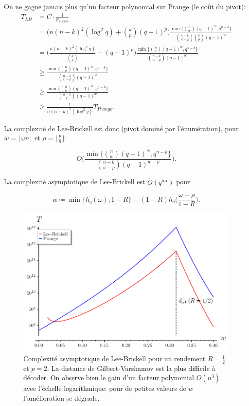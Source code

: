 \documentclass{scrartcl}[a4paper,10pt,headings=small,footinclude=false]
\theoremstyle{definition}
\theoremstyle{remark}
\begin{document}
On ne gagne jamais plus qu'un facteur polynomial sur Prange (le coût du pivot):
\begin{align*}
T_{LB} &= C\cdot \frac{1}{\mathbb{P}_{\text{succès}}}\\
&=\Bigg(n(n-k)^2(\log^2 q) + \binom{k}{p}(q-1)^p\Bigg)  \frac{\min \{ \binom{n}{w}(q-1)^w, q^{n-k}\}}{\binom{n-k}{w-p} \binom{k}{p}(q-1)^w}\\
&=\Bigg(\frac{n(n-k)^2(\log^2 q)}{\binom{k}{p}} +(q-1)^p\Bigg)  \frac{\min \{ \binom{n}{w}(q-1)^w, q^{n-k}\}}{\binom{n-k}{w-p} (q-1)^w}\\
&\geq \frac{\min \{ \binom{n}{w}(q-1)^w, q^{n-k}\}}{\binom{n-k}{w-p} (q-1)^w}\\
&\geq \frac{\min \{ \binom{n}{w}(q-1)^w, q^{n-k}\}}{\binom{n-k}{w} (q-1)^w}\\
&\geq \frac{1}{n(n-k)^2(\log^2 q)} T_{Prange}.
\end{align*}

La complexité de Lee-Brickell est donc (pivot dominé par l'énumération), pour $w=\lfloor \omega n \rfloor$ et $\rho=\lfloor \frac{p}{n} \rfloor$:

\[
	O\Bigg(\frac{\min \{ \binom{n}{w}(q-1)^w, q^{n-k}\}}{\binom{n-k}{w-p} (q-1)^{w-p}}\Bigg).
\]

La complexité asymptotique de Lee-Brickell est $\tilde{O}(q^{n\alpha})$ pour

\[
\alpha \coloneq \min\{ h_q(\omega), 1-R \} - (1-R) h_q\bigg(\frac{\omega - \rho}{1-R}\bigg).
\]

\begin{figure}[h]
\centering
\includegraphics{decodage_syndrome/LB.pdf}
\caption{Complexité asymptotique de Lee-Brickell pour un rendement $R=\frac{1}{2}$ et $p=2$. La distance de Gilbert-Varshamov est la plus difficile à décoder. On observe bien le gain d'un facteur polynomial $O(n^3)$ avec l'échelle logarithmique: pour de petites valeurs de $w$ l'amélioration se dégrade.}
\label{fig:prange}
\end{figure}
\end{document}
